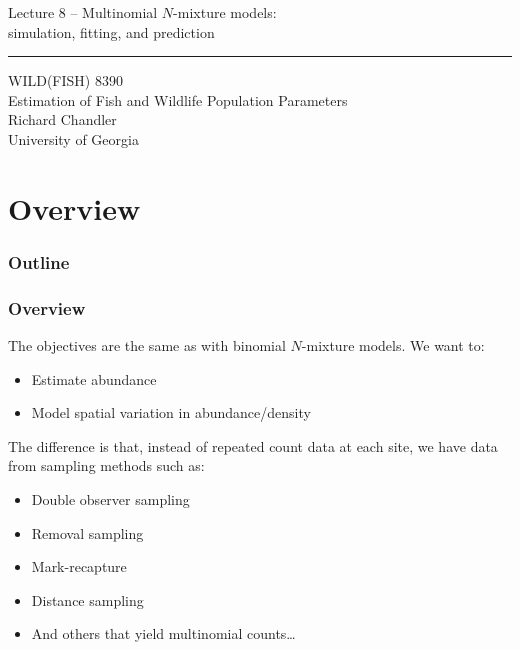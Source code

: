 \documentclass[color=usenames,dvipsnames]{beamer}\usepackage[]{graphicx}\usepackage[]{color}
\begin{document}
\begin{frame}[plain]
  \LARGE
  \centering
  {\LARGE Lecture 8 -- Multinomial $N$-mixture models: \\ simulation, fitting, and prediction} \\
  {\color{default} \rule{\textwidth}{0.1pt}}
  \vfill
  \large
  WILD(FISH) 8390 \\
  Estimation of Fish and Wildlife Population Parameters \\
  \vfill
  \large
  Richard Chandler \\
  University of Georgia \\
\end{frame}






\section{Overview}



\begin{frame}[plain]
  \frametitle{Outline}
  \Large
\end{frame}



\begin{frame}
  \frametitle{Overview}
  The objectives are the same as with binomial $N$-mixture models. %
  We want to:
  \begin{itemize}
    \item Estimate abundance
    \item Model spatial variation in abundance/density
  \end{itemize}
  \pause
  \vfill
  The difference is that, instead of repeated count data at each site,
  we have data from sampling methods such as:
  \begin{itemize}
    \item<2-> Double observer sampling
    \item<3-> Removal sampling
    \item<4-> Mark-recapture
    \item<5-> Distance sampling
    \item<6-> And others that yield multinomial counts\dots
  \end{itemize}
\end{frame}
\end{document}
